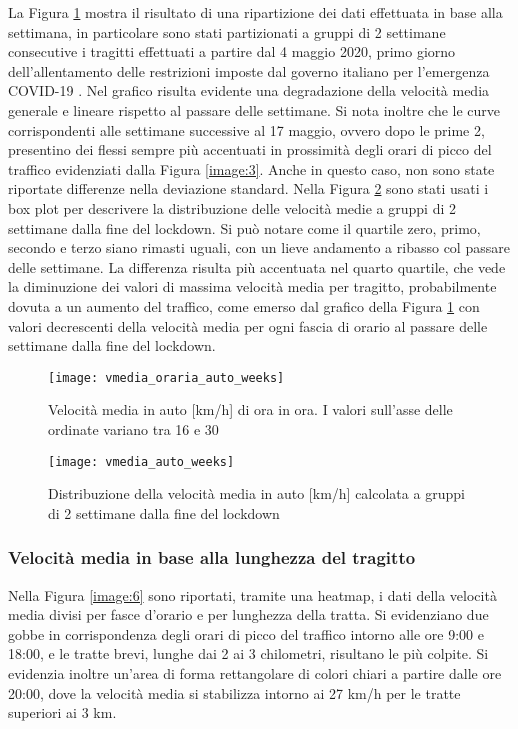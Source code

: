 La Figura \ref{image:5} mostra il risultato di una ripartizione dei dati effettuata in base alla settimana, in particolare sono stati partizionati a gruppi di 2 settimane consecutive i tragitti effettuati a partire dal 4 maggio 2020, primo giorno dell'allentamento delle restrizioni imposte dal governo italiano per l'emergenza COVID-19 \cite{misuredelgovernopercovid}. Nel grafico risulta evidente una degradazione della velocità media generale e lineare rispetto al passare delle settimane. Si nota inoltre che le curve corrispondenti alle settimane successive al 17 maggio, ovvero dopo le prime 2, presentino dei flessi sempre più accentuati in prossimità degli orari di picco del traffico evidenziati dalla Figura \ref{image:3}. Anche in questo caso, non sono state riportate differenze nella deviazione standard. Nella Figura \ref{image:27} sono stati usati i box plot per descrivere la distribuzione delle velocità medie a gruppi di 2 settimane dalla fine del lockdown. Si può notare come il quartile zero, primo, secondo e terzo siano rimasti uguali, con un lieve andamento a ribasso col passare delle settimane. La differenza risulta più accentuata nel quarto quartile, che vede la diminuzione dei valori di massima velocità media per tragitto, probabilmente dovuta a un aumento del traffico, come emerso dal grafico della Figura \ref{image:5} con valori decrescenti della velocità media per ogni fascia di orario al passare delle settimane dalla fine del lockdown.

\begin{figure}
	\centering
	\texttt{[image: vmedia\_oraria\_auto\_weeks]}
	\caption{Velocità media in auto [km/h] di ora in ora. I valori sull'asse delle ordinate variano tra 16 e 30}
	\label{image:5}
\end{figure}

\begin{figure}
	\centering
	\texttt{[image: vmedia\_auto\_weeks]}
	\caption{Distribuzione della velocità media in auto [km/h] calcolata a gruppi di 2 settimane dalla fine del lockdown}
	\label{image:27}
\end{figure}

\subsubsection{Velocità media in base alla lunghezza del tragitto}

Nella Figura \ref{image:6} sono riportati, tramite una heatmap, i dati della velocità media divisi per fasce d'orario e per lunghezza della tratta. Si evidenziano due gobbe in corrispondenza degli orari di picco del traffico intorno alle ore 9:00 e 18:00, e le tratte brevi, lunghe dai 2 ai 3 chilometri, risultano le più colpite. Si evidenzia inoltre un'area di forma rettangolare di colori chiari a partire dalle ore 20:00, dove la velocità media si stabilizza intorno ai 27 km/h per le tratte superiori ai 3 km.


